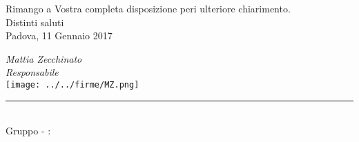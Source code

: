 \begin{titlepage}
\begin{large}
	Rimango a Vostra completa disposizione peri ulteriore chiarimento. \\
	Distinti saluti\\
	 
	Padova, 11 Gennaio 2017
	\begin{flushright}
		\emph{Mattia Zecchinato} \\ 
		\emph{Responsabile \GroupName{}} \\
		\texttt{[image: ../../firme/MZ.png]}
 	\end{flushright}
	
	\end{large}
	
	\begin{center}
		\rule{13cm}{0,03cm} \\
		Gruppo \GroupName{} - \email: \GroupEmail{}
	\end{center} 
	
	
\end{titlepage}
  
 \restoregeometry

